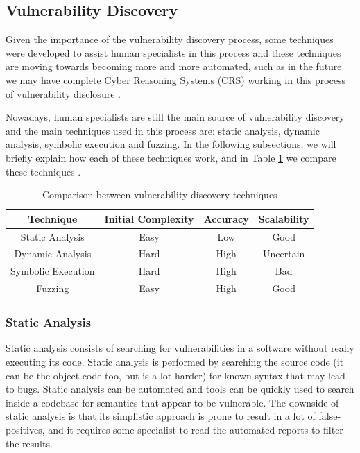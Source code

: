 \subsection{Vulnerability Discovery}
\label{subsec:vuln-disc}

Given the importance of the vulnerability discovery process, some techniques were developed to assist human specialists in this process and these techniques are moving towards becoming more and more automated, such as in the future we may have complete Cyber Reasoning Systems (CRS) working in this process of vulnerability disclosure \cite{crs}.

Nowadays, human specialists are still the main source of vulnerability discovery and the main techniques used in this process are: static analysis, dynamic analysis, symbolic execution and fuzzing. In the following subsections, we will briefly explain how each of these techniques work, and in Table \ref{tab:disc-techniques} we compare these techniques \cite{fuzzing}.

\begin{table}[h]
    \centering
    \caption{Comparison between vulnerability discovery techniques}
        \begin{tabular}{|c|c|c|c|}
        \hline
        \textbf{Technique}   & \textbf{Initial Complexity} & \textbf{Accuracy} & \textbf{Scalability} \\ \hline
        Static Analysis    & Easy      & Low   & Good         \\ \hline
        Dynamic Analysis   & Hard      & High  & Uncertain    \\ \hline
        Symbolic Execution & Hard      & High  & Bad          \\ \hline
        Fuzzing            & Easy      & High  & Good         \\ \hline
        \end{tabular}%
    \label{tab:disc-techniques}
\end{table}

\subsubsection{Static Analysis}

Static analysis consists of searching for vulnerabilities in a software without really executing its code. Static analysis is performed by searching the source code (it can be the object code too, but is a lot harder) for known syntax that may lead to bugs. Static analysis can be automated and tools can be quickly used to search inside a codebase for semantics that appear to be vulnerable. The downside of static analysis is that its simplistic approach is prone to result in a lot of false-positives, and it requires some specialist to read the automated reports to filter the results.

